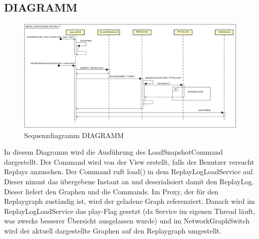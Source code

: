\subsection{DIAGRAMM}
\begin{figure}[H]
  \centering
  \includegraphics[width=\textwidth]{../diagramimages/spp-profinet-package-dissection.png}
  \caption[Sequenzdiagramm DIAGRAMM]{Sequenzdiagramm DIAGRAMM}
\end{figure}

In diesem Diagramm wird die Ausführung des LoadSnapshotCommand dargestellt. Der Command wird von der View erstellt, falls der Benutzer versucht Replays anzusehen. Der Command ruft load() in dem ReplayLogLoadService auf. Dieser nimmt das übergebene Instant an und deserialisiert damit den ReplayLog. Dieser liefert den Graphen und die Commands. Im Proxy, der für den Replaygraph zuständig ist, wird der geladene Graph referenziert. Danach wird im ReplayLogLoadService das play-Flag gesetzt (da Service im eigenen Thread läuft, was zwecks besserer Übersicht ausgelassen wurde) und im NetworkGraphSwitch wird der aktuell dargestellte Graphen auf den Replaygraph umgestellt.